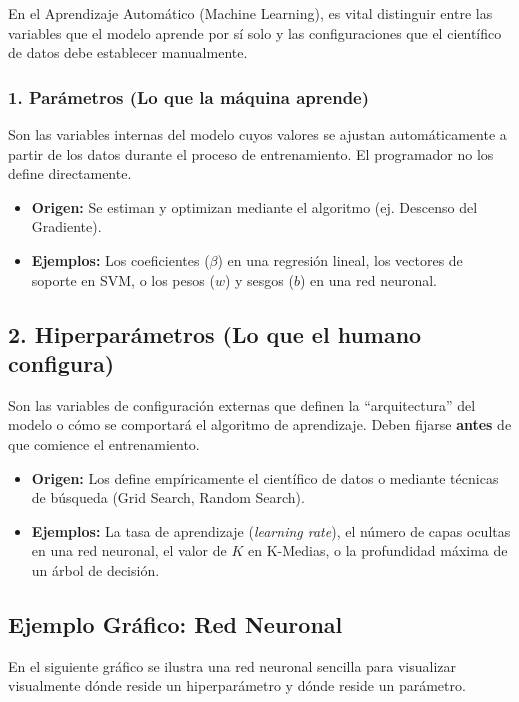 En el Aprendizaje Automático (Machine Learning), es vital distinguir entre las variables que el modelo aprende por sí solo y las configuraciones que el científico de datos debe establecer manualmente.

\subsubsection{1. Parámetros (Lo que la máquina aprende)}
Son las variables internas del modelo cuyos valores se ajustan automáticamente a partir de los datos durante el proceso de entrenamiento. El programador no los define directamente.
\begin{itemize}
    \item \textbf{Origen:} Se estiman y optimizan mediante el algoritmo (ej. Descenso del Gradiente).
    \item \textbf{Ejemplos:} Los coeficientes ($\beta$) en una regresión lineal, los vectores de soporte en SVM, o los pesos ($w$) y sesgos ($b$) en una red neuronal.
\end{itemize}

\subsection{2. Hiperparámetros (Lo que el humano configura)}
Son las variables de configuración externas que definen la ``arquitectura'' del modelo o cómo se comportará el algoritmo de aprendizaje. Deben fijarse \textbf{antes} de que comience el entrenamiento.
\begin{itemize}
    \item \textbf{Origen:} Los define empíricamente el científico de datos o mediante técnicas de búsqueda (Grid Search, Random Search).
    \item \textbf{Ejemplos:} La tasa de aprendizaje (\textit{learning rate}), el número de capas ocultas en una red neuronal, el valor de $K$ en K-Medias, o la profundidad máxima de un árbol de decisión.
\end{itemize}

\vspace{0.5cm}
\subsection{Ejemplo Gráfico: Red Neuronal}

En el siguiente gráfico se ilustra una red neuronal sencilla para visualizar visualmente dónde reside un hiperparámetro y dónde reside un parámetro.

